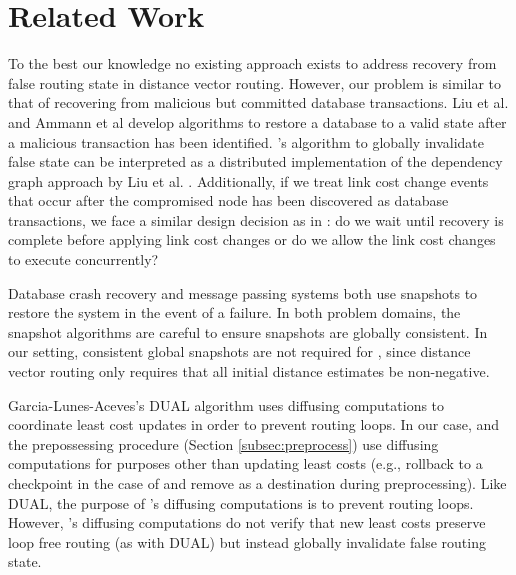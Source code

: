 \section{Related Work}
\label{sec:related-rollback}




To the best our knowledge no existing approach exists to address recovery from false routing state in distance vector routing. However,
our problem is similar to that of recovering from malicious but committed database transactions. Liu et al.
\cite{Liu98} and Ammann et al \cite{Liu00} develop algorithms to restore a database to a valid state after a malicious transaction has been identified. 
\purges's algorithm to globally invalidate
false state can be interpreted as a distributed implementation of the dependency graph approach by Liu et al. \cite{Liu00}.  Additionally,
if we treat link cost change events that occur after the compromised node has been discovered as database transactions, we face a similar design decision as in  \cite{Liu98}: 
do we wait until recovery is complete before applying link cost changes or do we allow the link cost changes to execute concurrently?


Database crash recovery \cite{Mohan92} and message passing systems \cite{Arini} both use snapshots to restore the system in the event of a failure. In both 
problem domains, the snapshot algorithms are careful to ensure snapshots are globally consistent. 
In our setting, consistent global snapshots are not required for \cprs, since  
distance vector routing only requires that all initial distance estimates be non-negative.

Garcia-Lunes-Aceves's DUAL algorithm \cite{JJ93} uses diffusing computations to coordinate least cost updates in order to prevent routing loops. 
In our case, \cpr and the prepossessing procedure (Section \ref{subsec:preprocess}) use diffusing computations for purposes other than updating least costs 
(e.g., rollback to a checkpoint in the case of \cpr
and remove \bad as a destination during preprocessing). Like DUAL, the purpose of \purges's diffusing computations is to prevent routing loops.  However, \purges's diffusing computations
do not verify that new least costs preserve loop free routing (as with DUAL) but instead globally invalidate false routing state. 


